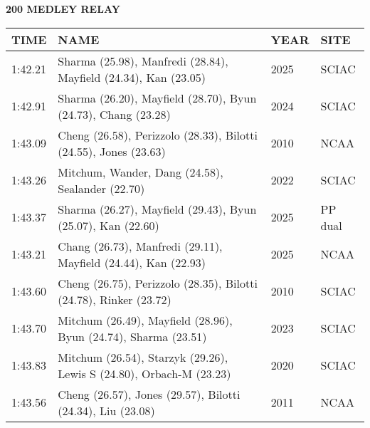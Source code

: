 \begin{center}
\begin{minipage}[t]{0.7\textwidth}
\centering
\textbf{200 MEDLEY RELAY}\\[0.05cm]
\begin{tabular}{@{}p{1.8cm}p{2.8cm}p{1.2cm}p{1.4cm}@{}}
\hline
\textbf{TIME} & \textbf{NAME} & \textbf{YEAR} & \textbf{SITE} \\
\hline
1:42.21 & Sharma (25.98), Manfredi (28.84), Mayfield (24.34), Kan (23.05) & 2025 & SCIAC \\
1:42.91 & Sharma (26.20), Mayfield (28.70), Byun (24.73), Chang (23.28) & 2024 & SCIAC \\
1:43.09 & Cheng (26.58), Perizzolo (28.33), Bilotti (24.55), Jones (23.63) & 2010 & NCAA \\
1:43.26 & Mitchum, Wander, Dang (24.58), Sealander (22.70) & 2022 & SCIAC \\
1:43.37 & Sharma (26.27), Mayfield (29.43), Byun (25.07), Kan (22.60) & 2025 & PP dual \\
1:43.21 & Chang (26.73), Manfredi (29.11), Mayfield (24.44), Kan (22.93) & 2025 & NCAA \\
1:43.60 & Cheng (26.75), Perizzolo (28.35), Bilotti (24.78), Rinker (23.72) & 2010 & SCIAC \\
1:43.70 & Mitchum (26.49), Mayfield (28.96), Byun (24.74), Sharma (23.51) & 2023 & SCIAC \\
1:43.83 & Mitchum (26.54), Starzyk (29.26), Lewis S (24.80), Orbach-M (23.23) & 2020 & SCIAC \\
1:43.56 & Cheng (26.57), Jones (29.57), Bilotti (24.34), Liu (23.08) & 2011 & NCAA \\
\hline
\end{tabular}
\end{minipage}
\end{center}

\vspace{0.4cm}

